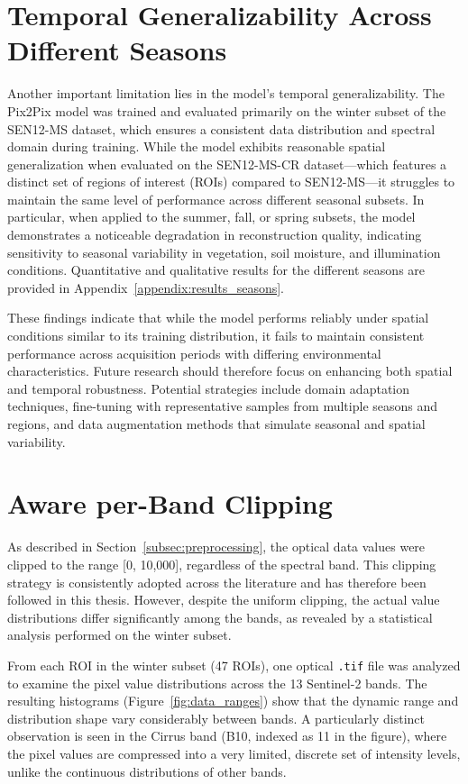 \section{Temporal Generalizability Across Different Seasons}
Another important limitation lies in the model’s temporal generalizability. The Pix2Pix model was trained and evaluated primarily on the winter subset of the SEN12-MS dataset, which ensures a consistent data distribution and spectral domain during training. While the model exhibits reasonable spatial generalization when evaluated on the SEN12-MS-CR dataset—which features a distinct set of regions of interest (ROIs) compared to SEN12-MS—it struggles to maintain the same level of performance across different seasonal subsets. In particular, when applied to the summer, fall, or spring subsets, the model demonstrates a noticeable degradation in reconstruction quality, indicating sensitivity to seasonal variability in vegetation, soil moisture, and illumination conditions. Quantitative and qualitative results for the different seasons are provided in Appendix~\ref{appendix:results_seasons}.

These findings indicate that while the model performs reliably under spatial conditions similar to its training distribution, it fails to maintain consistent performance across acquisition periods with differing environmental characteristics. Future research should therefore focus on enhancing both spatial and temporal robustness. Potential strategies include domain adaptation techniques, fine-tuning with representative samples from multiple seasons and regions, and data augmentation methods that simulate seasonal and spatial variability.


\section{Aware per-Band Clipping}

As described in Section~\ref{subsec:preprocessing}, the optical data values were clipped to the range [0, 10,000], regardless of the spectral band. This clipping strategy is consistently adopted across the literature and has therefore been followed in this thesis. However, despite the uniform clipping, the actual value distributions differ significantly among the bands, as revealed by a statistical analysis performed on the winter subset.

From each ROI in the winter subset (47 ROIs), one optical \texttt{.tif} file was analyzed to examine the pixel value distributions across the 13 Sentinel-2 bands. The resulting histograms (Figure~\ref{fig:data_ranges}) show that the dynamic range and distribution shape vary considerably between bands. A particularly distinct observation is seen in the Cirrus band (B10, indexed as 11 in the figure), where the pixel values are compressed into a very limited, discrete set of intensity levels, unlike the continuous distributions of other bands.


